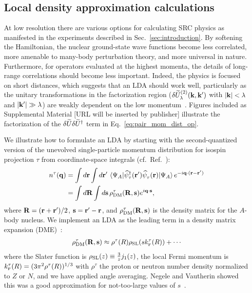 \documentclass[10pt,aps,prc,floatfix,twocolumn,nofootinbib]{revtex4-1}
\begin{document}

\subsection{Local density approximation calculations}
  \label{subsec:LDA}
  
At low resolution there are various options for calculating SRC physics as manifested in the experiments described in Sec.~\ref{sec:introduction}.
By softening the Hamiltonian, the nuclear ground-state wave functions become less correlated, more amenable to many-body perturbation theory, and more universal in nature.
Furthermore, for operators evaluated at the highest momenta, the details of long-range correlations should become less important.
Indeed, the physics is focused on short distances, which suggests that an LDA should work well, particularly as the unitary transformations in the factorization region ($\delta \widetilde U^{(2)}_\lambda(\mathbf{k},\mathbf{k}')$ with $|\mathbf{k}| < \lambda$ and $|\mathbf{k}'|\gg \lambda$) are weakly dependent on the low momentum~\cite{Tropiano:2020zwb}.
Figures included as Supplemental Material [URL will be inserted by publisher] illustrate the factorization of the $\delta \widetilde U\delta \widetilde U^{\dagger}$ term in Eq.~\eqref{eq:pair_mom_dist_op}.

We illustrate how to formulate an LDA by starting with the second-quantized version of the unevolved single-particle momentum distribution for isospin projection $\tau$ from coordinate-space integrals (cf.\ Ref.~\cite{Wiringa:2013ala}):
%
\begin{align} \label{eq:nk_from_dm}
    n^\tau(\mathbf{q}) &= \int d\mathbf{r} \int d\mathbf{r}' \,
     \mel{\Psi_A}{\widehat\psi^\dagger_\tau(\mathbf{r}')\widehat\psi^{\phantom{\dagger}}_\tau(\mathbf{r})}{\Psi_A}
      e^{-i\mathbf{q}\cdot(\mathbf{r} - \mathbf{r}')}  \notag \\
     &= \int d\mathbf{R} \int d\mathbf{s} \,
     \rho_{\rm DM}^\tau(\mathbf{R},\mathbf{s}) e^{i\mathbf{q}\cdot\mathbf{s}},
\end{align}
%
where $\mathbf{R} = (\mathbf{r} + \mathbf{r}')/2$, $\mathbf{s} = \mathbf{r}' - \mathbf{r}$,
and $\rho_{\rm DM}^\tau(\mathbf{R},\mathbf{s})$ is the density matrix for the $A$-body nucleus.
We implement an LDA as the leading term in a density matrix expansion (DME)~\cite{Negele:1972zp}:
%
\begin{align} \label{eq:dme}
    \rho_{\rm DM}^\tau(\mathbf{R},\mathbf{s}) \approx \rho^\tau(R) \rho_{\rm SL}(s k_{\scriptscriptstyle{\text F}}^\tau(R)) + \cdots
\end{align}
where the Slater function is $\rho_{\rm SL}(z) \equiv \frac{3}{z}j_1(z)$, the local Fermi momentum is $k_{\scriptscriptstyle{\text F}}^\tau(R) = (3\pi^2\rho^\tau(R))^{1/3}$ with $\rho^\tau$ the proton or neutron number density normalized to $Z$ or $N$, and we have applied angle averaging.
Negele and Vautherin showed this was a good approximation for not-too-large values of $s$~\cite{Negele:1972zp}.
\end{document}

